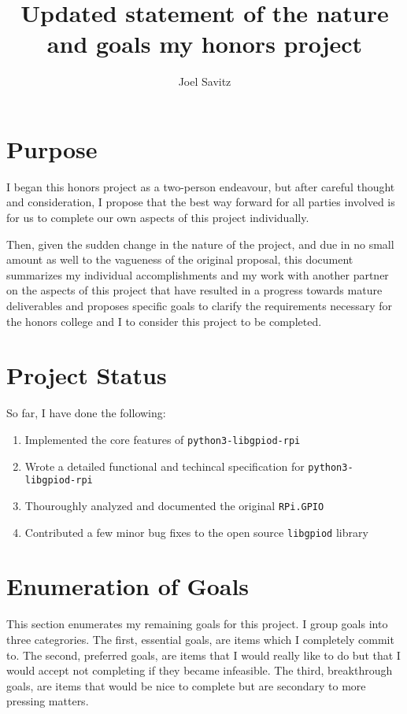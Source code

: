 \documentclass[12pt]{article}
\title{
{Updated statement of the nature and goals my honors project} \\
}
\author{Joel Savitz}
\begin{document}
\maketitle

\section{Purpose}

I began
this honors project
as a two-person endeavour,
but after careful thought and consideration,
I propose that the best way forward
for all parties involved
is for us to complete
our own aspects
of this project
individually.

Then,
given the sudden change
in the nature of the project,
and due in no small amount as well
to the vagueness of the original proposal,
this document summarizes
my individual accomplishments
and my work with another partner
on the aspects of this project
that have resulted in a progress
towards mature deliverables
and proposes specific goals
to clarify the requirements
necessary for the honors college and I
to consider this project to be completed.

\section{Project Status} 

So far, I have done the following:

\begin{enumerate}
	\item Implemented the core features of \texttt{\texttt{python3-libgpiod-rpi}} \cite{gpiolib}
	\item Wrote a detailed functional and techincal specification for \texttt{python3-libgpiod-rpi} \cite{spec}
	\item Thouroughly analyzed and documented the original \texttt{RPi.GPIO} \cite{rpi_gpio}
	\item Contributed a few minor bug fixes to the open source \texttt{libgpiod} library
		\cite{libgpiod_commit1} \cite{libgpiod_commit2}
\end{enumerate}

\section{Enumeration of Goals}

This section enumerates my remaining goals for this project.
I group goals into three categrories.
The first,
essential goals,
are items which I completely commit to.
The second,
preferred goals,
are items that I would really like to do
but that I  would accept not completing
if they became infeasible.
The third,
breakthrough goals,
are items that would be nice to complete
but are secondary to more pressing matters.
\end{document}
